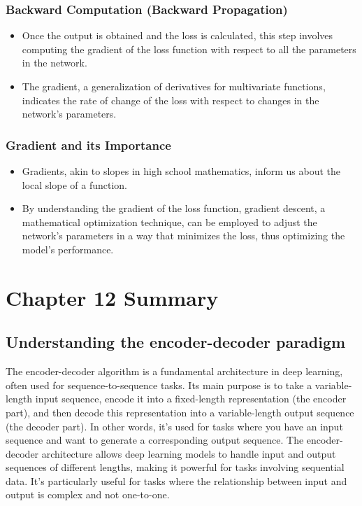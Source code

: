 \documentclass{article}
\begin{document}
\subsubsection{Backward Computation (Backward Propagation)}
\begin{itemize}
    \item Once the output is obtained and the loss is calculated, this step involves computing the gradient of the loss function with respect to all the parameters in the network.
    \item The gradient, a generalization of derivatives for multivariate functions, indicates the rate of change of the loss with respect to changes in the network's parameters.
\end{itemize}

\subsubsection{Gradient and its Importance}
\begin{itemize}
    \item Gradients, akin to slopes in high school mathematics, inform us about the local slope of a function.
    \item By understanding the gradient of the loss function, gradient descent, a mathematical optimization technique, can be employed to adjust the network's parameters in a way that minimizes the loss, thus optimizing the model's performance.
\end{itemize}

\section{Chapter 12 Summary}

\subsection{Understanding the encoder-decoder paradigm}
The encoder-decoder algorithm is a fundamental architecture in deep learning, often used for sequence-to-sequence tasks. 
Its main purpose is to take a variable-length input sequence, encode it into a fixed-length representation (the encoder part), and then decode this representation into a variable-length output sequence (the decoder part).
In other words, it's used for tasks where you have an input sequence and want to generate a corresponding output sequence.
The encoder-decoder architecture allows deep learning models to handle input and output sequences of different lengths, making it powerful for tasks involving sequential data. 
It's particularly useful for tasks where the relationship between input and output is complex and not one-to-one.
\end{document}
